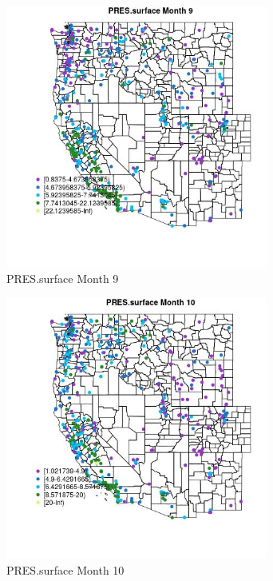 \begin{figure} 
\centering  
\includegraphics[width=0.77\textwidth]{Code_Outputs/ML_input_report_ML_input_PM25_Step5_part_d_de_duplicated_aves_ML_input_MapObsMo9PRESsurface.jpg} 
\caption{\label{fig:ML_input_report_ML_input_PM25_Step5_part_d_de_duplicated_aves_ML_inputMapObsMo9PRESsurface}PRES.surface Month 9} 
\end{figure} 
 

\clearpage 

\begin{figure} 
\centering  
\includegraphics[width=0.77\textwidth]{Code_Outputs/ML_input_report_ML_input_PM25_Step5_part_d_de_duplicated_aves_ML_input_MapObsMo10PRESsurface.jpg} 
\caption{\label{fig:ML_input_report_ML_input_PM25_Step5_part_d_de_duplicated_aves_ML_inputMapObsMo10PRESsurface}PRES.surface Month 10} 
\end{figure} 
 

